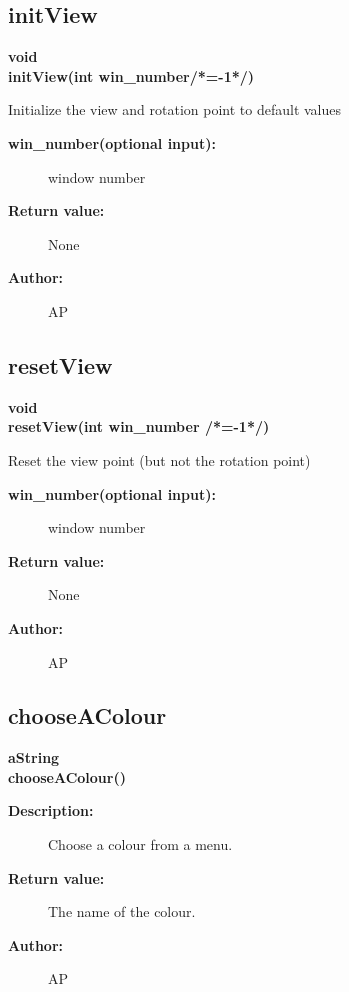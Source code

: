 \subsection{initView}
 
\begin{flushleft} \textbf{%
void  \\ 
\settowidth{\GLGraphicsInterfaceIncludeArgIndent}{initView(}%
initView(int win\_number/*=-1*/)
}\end{flushleft}
 Initialize the view and rotation point to default values
\begin{description}
\item[{\bf win\_number(optional input):}]  window number
\item[{\bf Return value:}]  None
\item[{\bf Author:}]  AP
\end{description}
\subsection{resetView}
 
\begin{flushleft} \textbf{%
void  \\ 
\settowidth{\GLGraphicsInterfaceIncludeArgIndent}{resetView(}%
resetView(int win\_number /*=-1*/)
}\end{flushleft}
 Reset the view point (but not the rotation point)
\begin{description}
\item[{\bf win\_number(optional input):}]  window number
\item[{\bf Return value:}]  None
\item[{\bf Author:}]  AP
\end{description}
\subsection{chooseAColour}
 
\begin{flushleft} \textbf{%
aString  \\ 
\settowidth{\GLGraphicsInterfaceIncludeArgIndent}{chooseAColour(}%
chooseAColour()
}\end{flushleft}
\begin{description}
\item[{\bf Description:}] 
  Choose a colour from a menu.
\item[{\bf Return value:}]  The name of the colour.
\item[{\bf Author:}]  AP
\end{description}
